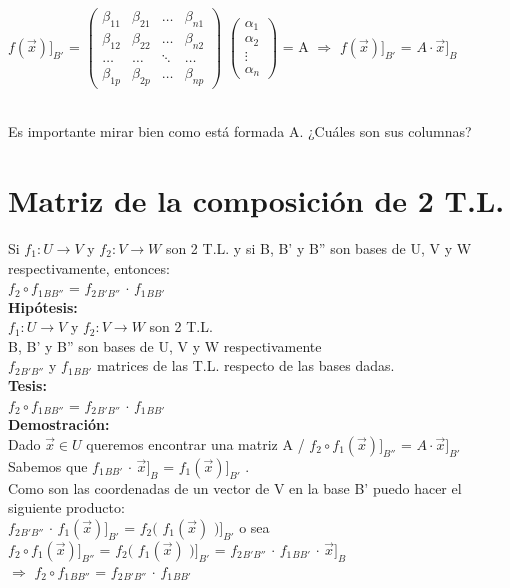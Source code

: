 \documentclass[11pt]{article}
\begin{document}
\noindent
$f(\vec{x})]_{B'}$ = 
$\begin{pmatrix} 
\beta_{11} & \beta_{21} & \ldots & \beta_{n1} \\
\beta_{12} & \beta_{22} & \ldots & \beta_{n2}\\
\ldots & \ldots & \ddots & \ldots \\
\beta_{1p} & \beta_{2p} & \ldots & \beta_{np}
\end{pmatrix}$
$\begin{pmatrix} 
\alpha_{1}\\
\alpha_{2}\\
\vdots\\
\alpha_{n}
\end{pmatrix}$ = A $\Rightarrow$ $f(\vec{x})]_{B'}$ = $A \cdot \vec{x}]_B$

\noindent \\
Es importante mirar bien como está formada A. ¿Cuáles son sus columnas? 

\noindent
\section{Matriz de la composición de 2 T.L.}
Si $f_1 : U \rightarrow V$ y $f_2 : V \rightarrow W$ son 2 T.L. y si B, B' y B'' son bases de U, V y W respectivamente, entonces: \\
\textbardbl $f_2 \circ f_1$\textbardbl$_{BB''}$ = 
\textbardbl $f_2$\textbardbl$_{B'B''}$ $\cdot$
\textbardbl $f_1$\textbardbl$_{BB'}$ \\
{\bfseries {Hipótesis:}} \\
$f_1 : U \rightarrow V$ y $f_2 : V \rightarrow W$ son 2 T.L. \\
B, B' y B'' son bases de U, V y W respectivamente \\
\textbardbl $f_2$\textbardbl$_{B'B''}$ y
\textbardbl $f_1$\textbardbl$_{BB'}$ matrices de las T.L. respecto de las bases dadas. \\
{\bfseries {Tesis:}} \\
\textbardbl $f_2 \circ f_1$\textbardbl$_{BB''}$ = 
\textbardbl $f_2$\textbardbl$_{B'B''}$ $\cdot$
\textbardbl $f_1$\textbardbl$_{BB'}$ \\
{\bfseries {Demostración:}} \\
Dado $\vec{x} \in U$ queremos encontrar una matriz A / $f_2 \circ f_1 (\vec{x})]_{B''}$ = $A \cdot \vec{x}]_{B'}$ \\
Sabemos que \textbardbl $f_1$\textbardbl$_{BB'}$ $\cdot$ $\vec{x}]_B$ = $f_1(\vec{x})]_{B'}$ . \\
Como son las coordenadas de un vector de V en la base B' puedo hacer el siguiente producto: \\
\textbardbl $f_2$\textbardbl$_{B'B''}$ $\cdot$ $f_1(\vec{x})]_{B'}$ 
= $f_2($ $f_1(\vec{x})$ $)]_{B'}$ o sea\\
$f_2 \circ f_1 (\vec{x})]_{B''}$ =
$f_2($ $f_1(\vec{x})$ $)]_{B'}$ =
\textbardbl $f_2$\textbardbl$_{B'B''}$ $\cdot$
\textbardbl $f_1$\textbardbl$_{BB'}$ $\cdot$ $\vec{x}]_{B}$ \\
$\Rightarrow$ \textbardbl $f_2 \circ f_1$\textbardbl$_{BB''}$ = 
\textbardbl $f_2$\textbardbl$_{B'B''}$ $\cdot$
\textbardbl $f_1$\textbardbl$_{BB'}$
\end{document}
